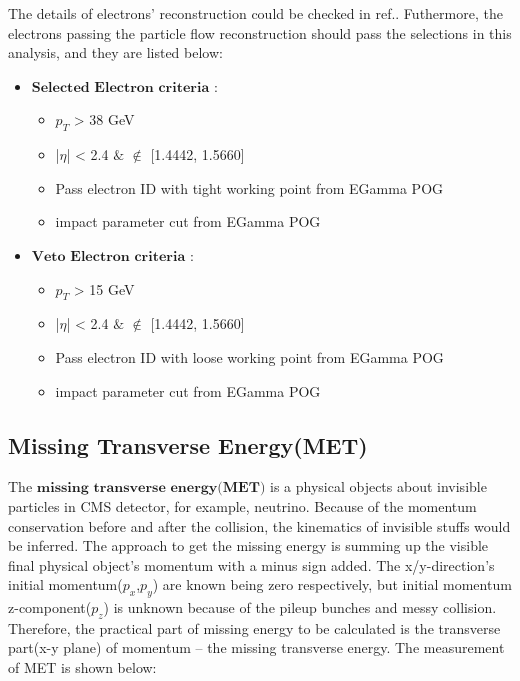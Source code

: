 			The details of electrons' reconstruction could be checked in ref.\cite{2015_el_reco}. Futhermore, the electrons passing the particle flow reconstruction should pass the selections in this analysis, and they are listed below:

			\begin{itemize}
				\item $\textbf{Selected Electron criteria}$ : 
					\begin{itemize}
						\item $p_T$ > 38 GeV
						\item |$\eta$| < 2.4 $\&$ $\notin$ [1.4442, 1.5660]
						\item Pass electron ID with tight working point from EGamma POG\cite{egamma_POG}
						\item impact parameter cut from EGamma POG\cite{egamma_POG}
					\end{itemize}
				\item $\textbf{Veto Electron criteria}$ : 
					\begin{itemize}
						\item $p_T$ > 15 GeV
						\item |$\eta$| < 2.4 $\&$ $\notin$ [1.4442, 1.5660]
						\item Pass electron ID with loose working point from EGamma POG\cite{egamma_POG}
						\item impact parameter cut from EGamma POG\cite{egamma_POG}
					\end{itemize}
			\label{PhysObj:itm:electron_selection}
			\end{itemize}

	\subsection{Missing Transverse Energy(MET)}
	\label{ssec:PhysObj_met}
		The $\textbf{missing}$ $\textbf{transverse}$ $\textbf{energy}$$\textbf{(MET)}$ is a physical objects about invisible particles in CMS detector, for example, neutrino. Because of the momentum conservation before and after the collision, the kinematics of invisible stuffs would be inferred. The approach to get the missing energy is summing up the visible final physical object's momentum with a minus sign added. The x/y-direction's initial momentum($p_x$,$p_y$) are known being zero respectively, but initial momentum z-component($p_z$) is unknown because of the pileup bunches and messy collision. Therefore, the practical part of missing energy to be calculated is the transverse part(x-y plane) of momentum -- the missing transverse energy. The measurement of MET is shown below:

